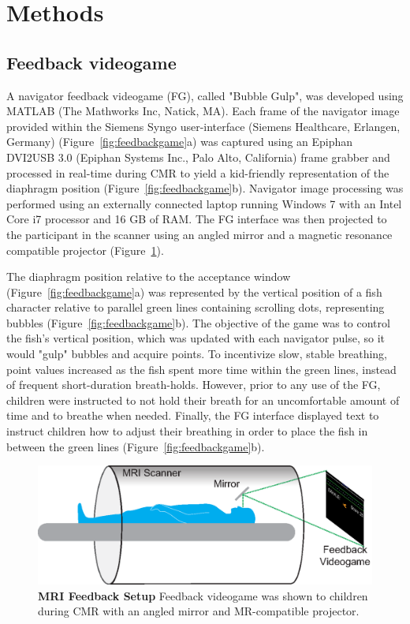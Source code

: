 \section{Methods}
\subsection{Feedback videogame}
	A navigator feedback videogame (FG), called "Bubble Gulp", was developed using MATLAB (The Mathworks Inc, Natick, MA). Each frame of the navigator image provided within the Siemens Syngo user-interface (Siemens Healthcare, Erlangen, Germany) (Figure~\ref{fig:feedbackgame}a) was captured using an Epiphan DVI2USB 3.0 (Epiphan Systems Inc., Palo Alto, California) frame grabber and processed in real-time during CMR to yield a kid-friendly representation of the diaphragm position (Figure~\ref{fig:feedbackgame}b). Navigator image processing was performed using an externally connected laptop running Windows 7 with an Intel Core i7 processor and 16 GB of RAM. The FG interface was then projected to the participant in the scanner using an angled mirror and a magnetic resonance compatible projector (Figure~\ref{fig:MRI_feedback}).
	
	The diaphragm position relative to the acceptance window (Figure~\ref{fig:feedbackgame}a) was represented by the vertical position of a fish character relative to parallel green lines containing scrolling dots, representing bubbles (Figure~\ref{fig:feedbackgame}b). The objective of the game was to control the fish's vertical position, which was updated with each navigator pulse, so it would "gulp" bubbles and acquire points. To incentivize slow, stable breathing, point values increased as the fish spent more time within the green lines, instead of frequent short-duration breath-holds. However, prior to any use of the FG, children were instructed to not hold their breath for an uncomfortable amount of time and to breathe when needed. Finally, the FG interface displayed text to instruct children how to adjust their breathing in order to place the fish in between the green lines (Figure~\ref{fig:feedbackgame}b).

\begin{figure} 
	\includegraphics{figures/gamepaper/02-feedback_videogame_in_mri}
	\caption[MRI Feedback Setup]{\textbf{MRI Feedback Setup} Feedback videogame was shown to children during CMR with an angled mirror and MR-compatible projector.}
	\label{fig:MRI_feedback}
\end{figure}

